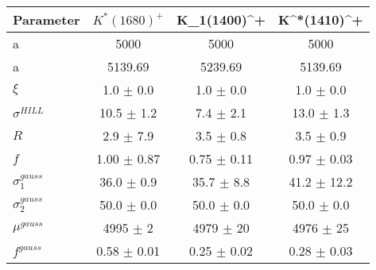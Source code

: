 \begin{table}
    \centering
    \begin{tabular}{lccc}
        \toprule
        Parameter & $K^*(1680)^+$ & K_1(1400)^+ & K^*(1410)^+ \\
        \midrule
      a & 5000 & 5000 & 5000 \\
      a & 5139.69 & 5239.69 & 5139.69 \\
      $\xi$ & 1.0 $\pm$ 0.0 & 1.0 $\pm$ 0.0 & 1.0 $\pm$ 0.0 \\
      $\sigma^{HILL}$ & 10.5 $\pm$ 1.2 & 7.4 $\pm$ 2.1 & 13.0 $\pm$ 1.3 \\
      $R$ & 2.9 $\pm$ 7.9 & 3.5 $\pm$ 0.8 & 3.5 $\pm$ 0.9 \\
      $f$ & 1.00 $\pm$ 0.87 & 0.75 $\pm$ 0.11 & 0.97 $\pm$ 0.03 \\
      $\sigma_1^{gauss}$ & 36.0 $\pm$ 0.9 & 35.7 $\pm$ 8.8 & 41.2 $\pm$ 12.2 \\
      $\sigma_2^{gauss}$ & 50.0 $\pm$ 0.0 & 50.0 $\pm$ 0.0 & 50.0 $\pm$ 0.0 \\
      $\mu^{gauss}$ & 4995 $\pm$ 2 & 4979 $\pm$ 20 & 4976 $\pm$ 25 \\
      $f^{gauss}$ & 0.58 $\pm$ 0.01 & 0.25 $\pm$ 0.02 & 0.28 $\pm$ 0.03 \\
  \bottomrule
  \end{tabular}
\end{table}
